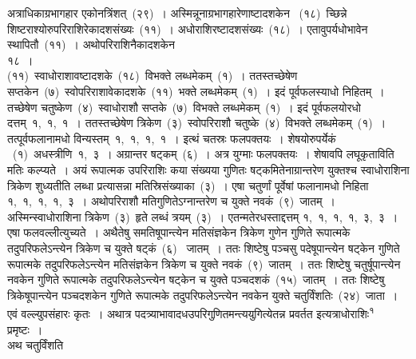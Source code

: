 \documentclass[11pt, openany]{book}
\begin{document}
\indent
अत्राधिकाग्रभागहार एकोनत्रिंशत्~(२९)~। अस्मिन्नूनाग्रभागहारेणाष्टादशकेन
~(१८)~च्छिन्ने शिष्टराश्योरुपरिराशिरेकादशसंख्यः~(११)~। अधोराशिरष्टादशसंख्यः~(१८)~। एतावुपर्यधोभावेन स्थापितौ~(११)~। अथोपरिराशिनैकादशकेन\\
\indent
\hspace{5.7cm}
१८~।\\
\noindent
(११)~स्वाधोराशावष्टादशके~(१८)~विभक्ते लब्धमेकम्~(१)~। ततस्तच्छेषेण सप्तकेन~(७)~स्वोपरिराशावेकादशके~(११)~भक्ते लब्धमेकम्~(१)~। इदं पूर्वफलस्याधो निहितम्~। तच्छेषेण चतुष्केण~(४)~स्वाधोराशौ सप्तके~(७)~विभक्ते लब्धमेकम्~(१)~। इदं पूर्वफलयोरधो दत्तम्~१,~१,~१~। ततस्तच्छेषेण त्रिकेण~(३)~स्वोपरिराशौ चतुष्के~(४)~विभक्ते लब्धमेकम्~(१)~। तत्पूर्वफलानामधो विन्यस्तम्~१,~१,~१,~१~। इत्थं चतस्रः फलपक्तयः~। शेषयोरुपर्येकं ~(१)~अधस्त्रीणि~१,~३~। अग्रान्तर षट्कम्~(६)~। अत्र युग्माः फलपक्तयः~। शेषावपि लघूकृताविति मतिः कल्प्यते~। अयं रूपात्मक उपरिराशिः कया संख्यया गुणितः षट्कमितेनाग्रान्तरेण युक्तश्च स्वाधोराशिना त्रिकेण शुध्यतीति लब्धा प्रत्यासन्ना मतिस्रिसंख्याका~(३)~। एषा चतुर्णां पूर्वेषां फलानामधो निहिता १,~१,~१,~१,~३~। अथोपरिराशौ मतिगुणितेऽग्नान्तरेण च युक्ते नवकं~(९)~जातम्~। अस्मिन्स्वाधोराशिना त्रिकेण~(३)~हृते लब्धं त्रयम्~(३)~। एतन्मतेरधस्ताद्दत्तम् १,~१,~१,~१,~३,~३~। एषा फलवल्लीत्युच्यते~। अथैतेषु समतिषूपान्त्येन मतिसंज्ञकेन त्रिकेण गुणेन गुणिते रूपात्मके तदुपरिफलेऽन्त्येन त्रिकेण च युक्ते षट्कं~(६)~ जातम्~। ततः शिष्टेषु पञ्चसु पदेषूपान्त्येन षट्केन गुणिते रूपात्मके तदुपरिफलेऽन्त्येन मतिसंज्ञकेन त्रिकेण च युक्ते नवकं~(९)~जातम्~। ततः शिष्टेषु चतुर्षूपान्त्येन नवकेन गुणिते रूपात्मके तदुपरिफलेऽन्त्येन षट्केन च युक्ते पञ्चदशकं~(१५)~जातम्~। ततः शिष्टेषु त्रिकेषूपान्त्येन पञ्चदशकेन गुणिते रूपात्मके तदुपरिफलेऽन्त्येन नवकेन युक्ते चतुर्विंशतिः~(२४)~जाता~। एवं वल्ल्युपसंहारः कृतः~। अथात्र पदत्र्याभावादधउपरिगुणितमन्त्ययुगित्येतन्न प्रवर्तत इत्यत्राधोराशिः{\textsuperscript{१}} प्रमृष्टः~।\\ 
अथ चतुर्विंशति \textendash

\end{document}
